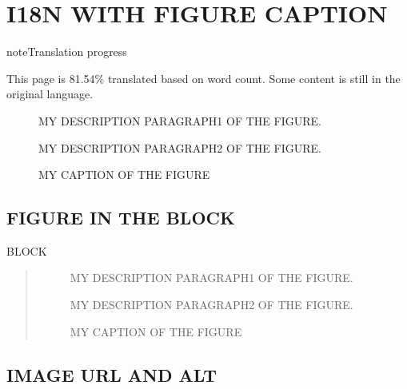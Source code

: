 \documentclass[letterpaper,10pt,english]{sphinxmanual}
\begin{document}
\sphinxstepscope


\chapter{I18N WITH FIGURE CAPTION}
\label{\detokenize{figure:i18n-with-figure-caption}}\label{\detokenize{figure::doc}}
\begin{sphinxadmonition}{note}{Translation progress}

\sphinxAtStartPar
This page is 81.54\% translated based on word count. Some content is still in the original language.
\end{sphinxadmonition}

\begin{figure}[htbp]
\centering
\capstart

\noindent{}
\caption{MY CAPTION OF THE FIGURE}\label{\detokenize{figure:id1}}
\begin{sphinxlegend}
\sphinxAtStartPar
MY DESCRIPTION PARAGRAPH1 OF THE FIGURE.

\sphinxAtStartPar
MY DESCRIPTION PARAGRAPH2 OF THE FIGURE.
\end{sphinxlegend}
\end{figure}


\section{FIGURE IN THE BLOCK}
\label{\detokenize{figure:figure-in-the-block}}
\sphinxAtStartPar
BLOCK
\begin{quote}

\begin{figure}[htbp]
\centering
\capstart

\noindent{}
\caption{MY CAPTION OF THE FIGURE}\label{\detokenize{figure:id2}}
\begin{sphinxlegend}
\sphinxAtStartPar
MY DESCRIPTION PARAGRAPH1 OF THE FIGURE.

\sphinxAtStartPar
MY DESCRIPTION PARAGRAPH2 OF THE FIGURE.
\end{sphinxlegend}
\end{figure}
\end{quote}


\section{IMAGE URL AND ALT}
\label{\detokenize{figure:image-url-and-alt}}
\noindent{}
\end{document}
